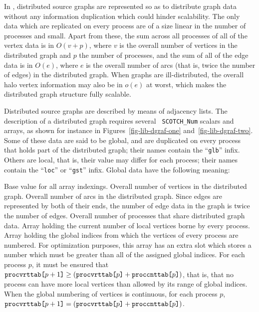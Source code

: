 In \ptscotch, distributed source graphs are represented so as to
distribute graph data without any information duplication which could
hinder scalability. The only data which are replicated on every
process are of a size linear in the number of processes and
small. Apart from these, the sum across all processes of all of the
vertex data is in $O(v+p)$, where $v$ is the overall number of
vertices in the distributed graph and $p$ the number of processes, and
the sum of all of the edge data is in $O(e)$, where $e$ is the overall
number of arcs (that is, twice the number of edges) in the distributed
graph. When graphs are ill-distributed, the overall halo vertex
information may also be in $o(e)$ at worst, which makes the distributed
graph structure fully scalable.

Distributed source graphs are described by means of adjacency
lists. The description of a distributed graph requires several {\tt
SCOTCH\_Num} scalars and arrays, as shown for instance in
Figures~\ref{fig-lib-dgraf-one} and~\ref{fig-lib-dgraf-two}.
Some of these data are said to be global, and are duplicated on every
process that holds part of the distributed graph; their names contain
the ``{\tt glb}'' infix. Others are local, that is, their value may
differ for each process; their names contain the ``{\tt loc}'' or
``{\tt gst}'' infix. Global data have the following meaning:
\begin{itemize}
\iteme[{\tt baseval}]
Base value for all array indexings.
\iteme[{\tt vertglbnbr}]
Overall number of vertices in the distributed graph.
\iteme[{\tt edgeglbnbr}]
Overall number of arcs in the distributed graph. Since edges are
represented by both of their ends, the number of edge data in
the graph is twice the number of edges.
\iteme[{\tt procglbnbr}]
Overall number of processes that share distributed graph data.
\iteme[{\tt proccnttab}]
Array holding the current number of local vertices borne by every process.
\iteme[{\tt procvrttab}]
Array holding the global indices from which the vertices of every
process are numbered. For optimization purposes, this array has an
extra slot which stores a number which must be greater than all of the
assigned global indices. For each process $p$, it must be ensured that
$\mbox{\tt proc\lbt vrt\lbt tab[}p + 1\mbox{\tt]} \geq
(\mbox{\tt proc\lbt vrt\lbt tab[}p\mbox{\tt]} +
\mbox{\tt proc\lbt cnt\lbt tab[}p\mbox{\tt]})$, that is, that no process
can have more local vertices than allowed by its range of global indices.
When the global numbering of vertices is continuous, for each process $p$,
$\mbox{\tt proc\lbt vrt\lbt tab[}p + 1\mbox{\tt]} =
(\mbox{\tt proc\lbt vrt\lbt tab[}p\mbox{\tt]} +
\mbox{\tt proc\lbt cnt\lbt tab[}p\mbox{\tt]})$.
\end{itemize}
